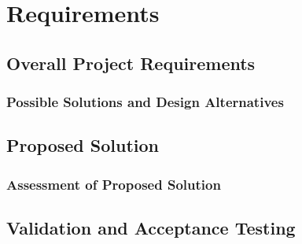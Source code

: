 \chapter{Requirements}

\section{Overall Project Requirements}

\subsection{Possible Solutions and Design Alternatives}

\section{Proposed Solution}

\subsection{Assessment of Proposed Solution}

\section{Validation and Acceptance Testing}
